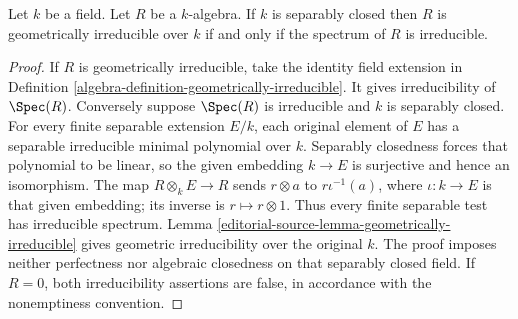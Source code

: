\begin{lemma}
\label{editorial-source-lemma-separably-closed-irreducible-implies-geometric}
Let $k$ be a field.
Let $R$ be a $k$-algebra.
If $k$ is separably closed then $R$ is
geometrically irreducible over $k$ if and only if the
spectrum of $R$ is irreducible.
\end{lemma}

\begin{proof}
If $R$ is geometrically irreducible,
take the identity field extension in
Definition \ref{algebra-definition-geometrically-irreducible}.
It gives irreducibility of $\Spec(R)$.
Conversely suppose $\Spec(R)$ is
irreducible and $k$ is separably closed.
For every finite separable extension
$E/k$, each original element of $E$
has a separable irreducible minimal
polynomial over $k$. Separably closedness
forces that polynomial to be linear,
so the given embedding $k\to E$ is
surjective and hence an isomorphism.
The map $R\otimes_k E\to R$ sends
$r\otimes a$ to $r\iota^{-1}(a)$,
where $\iota:k\to E$ is that given
embedding; its inverse is $r\mapsto r\otimes1$.
Thus every finite separable test has
irreducible spectrum. Lemma
\ref{editorial-source-lemma-geometrically-irreducible}
gives geometric irreducibility over
the original $k$. The proof imposes
neither perfectness nor algebraic
closedness on that separably closed
field. If $R=0$, both irreducibility
assertions are false, in accordance
with the nonemptiness convention.
\end{proof}